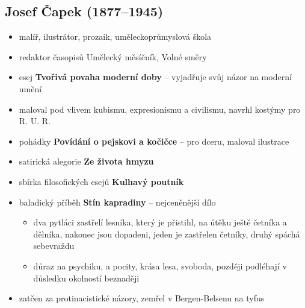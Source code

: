 \subsection{Josef Čapek (1877--1945)}
	\begin{itemize}
	\item malíř, ilustrátor, prozaik, uměleckoprůmyslová škola
	\item redaktor časopisů Umělecký měsíčník, Volné směry
	\item esej \textbf{Tvořivá povaha moderní doby} -- vyjadřuje svůj názor na moderní umění
	\item maloval pod vlivem kubismu, expresionismu a civilismu, navrhl kostýmy pro R. U. R.
	\item pohádky \textbf{Povídání o pejskovi a kočičce} -- pro dceru, maloval ilustrace
	\item satirická alegorie \textbf{Ze života hmyzu}
	\item sbírka filosofických esejů \textbf{Kulhavý poutník}
	\item baladický příběh \textbf{Stín kapradiny} -- nejceněnější dílo
		\begin{itemize}
		\item dva pytláci zastřelí lesníka, který je přistihl, na útěku ještě četníka a dělníka, nakonec jsou dopadeni, jeden je zastřelen četníky, druhý spáchá sebevraždu
		\item důraz na psychiku, a pocity, krása lesa, svoboda, později podléhají v důsledku okolností beznaději
		\end{itemize}
	\item zatčen za protinacistické názory, zemřel v Bergen-Belsenu na tyfus
	\end{itemize}

